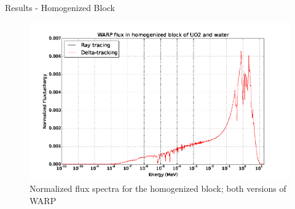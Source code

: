 \documentclass[xcolor=x11names, compress]{beamer}
\renewcommand{\(}{\begin{columns}}
\renewcommand{\)}{\end{columns}}
\newcommand{\<}[1]{\begin{column}{#1}}
\renewcommand{\>}{\end{column}}
\begin{document}
\begin{frame}{Results - Homogenized Block}
	\begin{figure}[h!]
	\includegraphics[width=0.9\linewidth]{../figs/homfuel}
	\caption*{Normalized flux spectra for the homogenized block; both 
	versions of WARP \label{homfuel}}
	\end{figure}
\end{frame}
\end{document}
